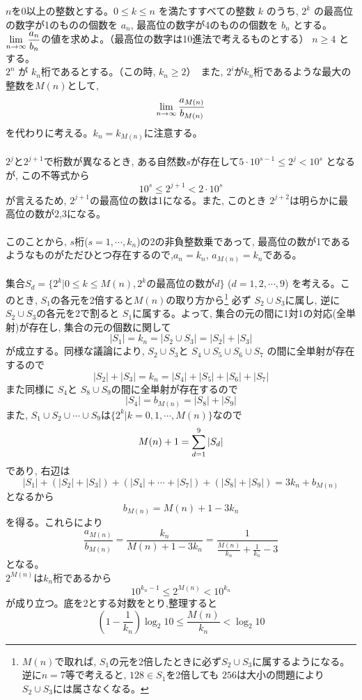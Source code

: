 $n$を0以上の整数とする。$0\leq k\leq n$ を満たすすべての整数 $k$ のうち, $2^k$ の最高位の数字が1のものの個数を $a_n$, 最高位の数字が4のものの個数を $b_n$ とする。$\displaystyle\lim_{n\to \infty} \dfrac{a_n}{b_n}$の値を求めよ。（最高位の数字は10進法で考えるものとする）
\enthm
$n\geq 4$ とする。\\
$2^n$ が $k_n$桁であるとする。（この時, $k_n\geq 2$）　また,  $2^i$が$k_n$桁であるような最大の整数を$M(n)$として,
\[\displaystyle\lim_{n\to \infty} \dfrac{a_{M(n)}}{b_{M(n)}}\]
を代わりに考える。$k_n=k_{M(n)}$に注意する。
\\
\\
$2^{j}$と$2^{j+1}$で桁数が異なるとき, ある自然数$s$が存在して$5\cdot 10^{s-1}\leq 2^j< 10^{s}$ となるが, この不等式から
\[10^{s}\leq 2^{j+1}< 2\cdot 10^{s}\] 
が言えるため, $2^{j+1}$の最高位の数は1になる。また, このとき $2^{j+2}$は明らかに最高位の数が2,3になる。\\
\\
このことから, $s$桁($s=1,\cdots, k_n$)の2の非負整数乗であって, 最高位の数が1であるようなものがただひとつ存在するので,$a_n=k_n$,  $a_{M(n)}=k_{n}$である。\\
\\
集合$S_d=\{ 2^{k} | 0\leq k\leq M(n), 2^k\mbox{の最高位の数が$d$}\}$  ($d=1,2,\cdots ,9$) を考える。このとき, $S_1$の各元を2倍すると$M(n)$の取り方から\footnote{$M(n)$で取れば, $S_1$の元を2倍したときに必ず$S_2\cup S_3$に属するようになる。逆に$n=7$等で考えると, $128\in S_1$を2倍しても $256$は大小の問題により　$S_2\cup S_3$には属さなくなる。}
必ず $S_2\cup S_3$に属し, 逆に $S_2\cup S_3$の各元を2で割ると $S_1$に属する。よって, 集合の元の間に1対1の対応(全単射)が存在し, 集合の元の個数に関して
\[|S_1|=k_n=|S_2\cup S_3|=|S_2|+|S_3|\]
が成立する。同様な議論により, $S_2\cup S_3$と $S_4\cup S_5\cup S_6 \cup S_7$ の間に全単射が存在するので
\[|S_2|+|S_3|=k_n=|S_4|+|S_5|+|S_6|+|S_7|\]
また同様に $S_4$と $S_8\cup S_9$の間に全単射が存在するので
\[|S_4|=b_{M(n)}=|S_8|+|S_9|\]
また, $S_1\cup S_2\cup \cdots \cup S_9$は$\{2^{k}| k=0,1,\cdots , M(n)\}$なので
\[M(n)+1=\displaystyle\sum_{d=1}^9 |S_d|\]
であり, 右辺は
\[|S_1| +(|S_2|+|S_3|)+(|S_4|+\cdots +|S_7|) +(|S_8|+|S_9|)=3k_n+b_{M(n)}\]
となるから 
\[b_{M(n)}=M(n)+1-3k_{n}\]
を得る。これらにより
\[\dfrac{a_{M(n)}}{b_{M(n)}}=\dfrac{k_n}{M(n)+1-3k_{n}}=\dfrac{1}{\frac{M(n)}{k_n} +\frac{1}{k_n}-3}\]
となる。\\
$2^{M(n)}$は$k_n$桁であるから
\[10^{k_n-1}\leq 2^{M(n)}<10^{k_n}\]
が成り立つ。底を2とする対数をとり,整理すると
\[\left(1- \dfrac{1}{k_n}\right)\log_2{10}\leq \dfrac{M(n)}{k_n} < \log_2{10} \]
